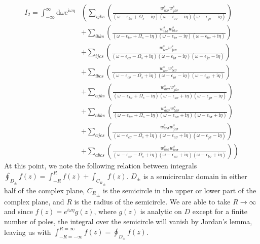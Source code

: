 \documentclass[12pt]{caltech_thesis}
\begin{document}
\begin{equation}
\begin{aligned}
I_2 = \int_{-\infty }^{\infty }\mathrm{d} \omega \mathrm{e}^{\mathrm{i \omega \eta}} 
& \left( \sum_{ijks} \left( \frac{w_{i k \sigma}^s w_{j k \sigma}^s}{(\omega-\epsilon_{k \sigma}+\Omega_s-\mathrm{i} \eta)(\omega-\epsilon_{i \sigma}-\mathrm{i} \eta)(\omega-\epsilon_{j \sigma}-\mathrm{i} \eta)} \right) \right.\\
& \left. + \sum_{ibks} \left( \frac{w_{i k \sigma}^s w_{b k \sigma}^s}{(\omega-\epsilon_{k \sigma}+\Omega_s-\mathrm{i} \eta)(\omega-\epsilon_{i \sigma}-\mathrm{i} \eta)(\omega-\epsilon_{b \sigma}+\mathrm{i} \eta)} \right) \right.\\
& \left. + \sum_{ijcs} \left( \frac{w_{i c \sigma}^s w_{j c \sigma}^s}{(\omega-\epsilon_{c \sigma}-\Omega_s+\mathrm{i} \eta)(\omega-\epsilon_{i \sigma}-\mathrm{i} \eta)(\omega-\epsilon_{j \sigma}-\mathrm{i} \eta)} \right) \right.\\
& \left. + \sum_{ibcs} \left( \frac{w_{i c \sigma}^s w_{b c \sigma}^s}{(\omega-\epsilon_{c \sigma}-\Omega_s+\mathrm{i} \eta)(\omega-\epsilon_{i \sigma}-\mathrm{i} \eta)(\omega-\epsilon_{b \sigma}+\mathrm{i} \eta)} \right) \right. \\
& \left. + \sum_{ajks} \left( \frac{w_{a k \sigma}^s w_{j k \sigma}^s}{(\omega-\epsilon_{k \sigma}+\Omega_s-\mathrm{i} \eta)(\omega-\epsilon_{a \sigma}+\mathrm{i} \eta)(\omega-\epsilon_{j \sigma}-\mathrm{i} \eta)} \right) \right.\\
& \left. + \sum_{abks} \left( \frac{w_{a k \sigma}^s w_{b k \sigma}^s}{(\omega-\epsilon_{k \sigma}+\Omega_s-\mathrm{i} \eta)(\omega-\epsilon_{a \sigma}+\mathrm{i} \eta)(\omega-\epsilon_{b \sigma}+\mathrm{i} \eta)} \right) \right.\\
& \left. + \sum_{ajcs} \left( \frac{w_{a c \sigma}^s w_{j c \sigma}^s}{(\omega-\epsilon_{c \sigma}-\Omega_s+\mathrm{i} \eta)(\omega-\epsilon_{a \sigma}+\mathrm{i} \eta)(\omega-\epsilon_{j \sigma}-\mathrm{i} \eta)} \right) \right.\\
& \left. + \sum_{abcs} \left( \frac{w_{a c \sigma}^s w_{b c \sigma}^s}{(\omega-\epsilon_{c \sigma}-\Omega_s+\mathrm{i} \eta)(\omega-\epsilon_{a \sigma}+\mathrm{i} \eta)(\omega-\epsilon_{b \sigma}+\mathrm{i} \eta)} \right) \right)
\label{eqnexpanded_integral}
\end{aligned}
\end{equation}
At this point, we note the following relation between integrals $\oint_{D_{\pm}} f(z) = \int_{-R}^R f(z) + \int_{{C_R}_{\pm}} f(z)$. $D_{\pm}$ is a semicircular domain in either half of the complex plane, ${C_R}_{\pm}$ is the semicircle in the upper or lower part of the complex plane, and $R$ is the radius of the semicircle. We are able to take $R\rightarrow \infty$ and since $f(z)=e^{i\omega \eta}g(z)$, where $g(z)$ is analytic on $D$ except for a finite number of poles, the integral over the semicircle will vanish by Jordan's lemma, leaving us with $\int_{-R=-\infty}^{R=\infty} f(z)= \oint_{D_{\pm}} f(z)$. 
\end{document}
